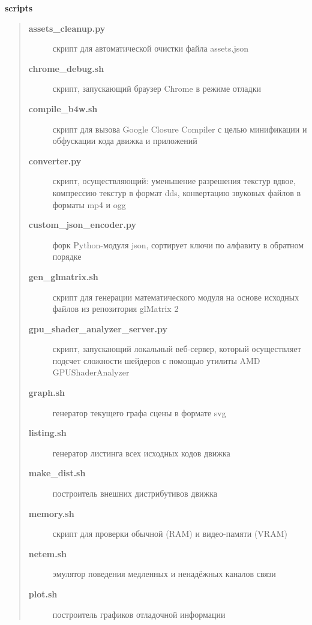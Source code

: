 \documentclass[a4paper,12pt,oneside]{sphinxmanual}
\begin{document}
\textbf{scripts}
\begin{quote}
\begin{description}
\item[{\textbf{assets\_cleanup.py}}] \leavevmode
скрипт для автоматической очистки файла assets.json

\item[{\textbf{chrome\_debug.sh}}] \leavevmode
скрипт, запускающий браузер Chrome в режиме отладки

\item[{\textbf{compile\_b4w.sh}}] \leavevmode
скрипт для вызова Google Closure Compiler с целью минификации и обфускации кода движка и приложений

\item[{\textbf{converter.py}}] \leavevmode
скрипт, осуществляющий: уменьшение разрешения текстур вдвое, компрессию текстур в формат dds, конвертацию звуковых файлов в форматы mp4 и ogg

\item[{\textbf{custom\_json\_encoder.py}}] \leavevmode
форк Python-модуля json, сортирует ключи по алфавиту в обратном порядке

\item[{\textbf{gen\_glmatrix.sh}}] \leavevmode
скрипт для генерации математического модуля на основе исходных файлов из
репозитория glMatrix 2

\item[{\textbf{gpu\_shader\_analyzer\_server.py}}] \leavevmode
скрипт, запускающий локальный веб-сервер, который осуществляет подсчет сложности шейдеров с помощью утилиты AMD GPUShaderAnalyzer

\item[{\textbf{graph.sh}}] \leavevmode
генератор текущего графа сцены в формате svg

\item[{\textbf{listing.sh}}] \leavevmode
генератор листинга всех исходных кодов движка

\item[{\textbf{make\_dist.sh}}] \leavevmode
построитель внешних дистрибутивов движка

\item[{\textbf{memory.sh}}] \leavevmode
скрипт для проверки обычной (RAM) и видео-памяти (VRAM)

\item[{\textbf{netem.sh}}] \leavevmode
эмулятор поведения медленных и ненадёжных каналов связи

\item[{\textbf{plot.sh}}] \leavevmode
построитель графиков отладочной информации


\end{description}
\end{quote}
\end{document}
